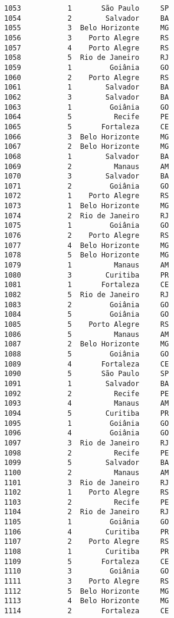 \documentclass[11pt]{article}
\begin{document}
\begin{Verbatim}[commandchars=\\\{\}]
1053           1       São Paulo     SP  
1054           2        Salvador     BA  
1055           3  Belo Horizonte     MG  
1056           3    Porto Alegre     RS  
1057           4    Porto Alegre     RS  
1058           5  Rio de Janeiro     RJ  
1059           1         Goiânia     GO  
1060           2    Porto Alegre     RS  
1061           1        Salvador     BA  
1062           3        Salvador     BA  
1063           1         Goiânia     GO  
1064           5          Recife     PE  
1065           5       Fortaleza     CE  
1066           3  Belo Horizonte     MG  
1067           2  Belo Horizonte     MG  
1068           1        Salvador     BA  
1069           2          Manaus     AM  
1070           3        Salvador     BA  
1071           2         Goiânia     GO  
1072           1    Porto Alegre     RS  
1073           1  Belo Horizonte     MG  
1074           2  Rio de Janeiro     RJ  
1075           1         Goiânia     GO  
1076           2    Porto Alegre     RS  
1077           4  Belo Horizonte     MG  
1078           5  Belo Horizonte     MG  
1079           1          Manaus     AM  
1080           3        Curitiba     PR  
1081           1       Fortaleza     CE  
1082           5  Rio de Janeiro     RJ  
1083           2         Goiânia     GO  
1084           5         Goiânia     GO  
1085           5    Porto Alegre     RS  
1086           5          Manaus     AM  
1087           2  Belo Horizonte     MG  
1088           5         Goiânia     GO  
1089           4       Fortaleza     CE  
1090           5       São Paulo     SP  
1091           1        Salvador     BA  
1092           2          Recife     PE  
1093           4          Manaus     AM  
1094           5        Curitiba     PR  
1095           1         Goiânia     GO  
1096           4         Goiânia     GO  
1097           3  Rio de Janeiro     RJ  
1098           2          Recife     PE  
1099           5        Salvador     BA  
1100           2          Manaus     AM  
1101           3  Rio de Janeiro     RJ  
1102           1    Porto Alegre     RS  
1103           2          Recife     PE  
1104           2  Rio de Janeiro     RJ  
1105           1         Goiânia     GO  
1106           4        Curitiba     PR  
1107           2    Porto Alegre     RS  
1108           1        Curitiba     PR  
1109           5       Fortaleza     CE  
1110           3         Goiânia     GO  
1111           3    Porto Alegre     RS  
1112           5  Belo Horizonte     MG  
1113           4  Belo Horizonte     MG  
1114           2       Fortaleza     CE  

\end{Verbatim}
\end{document}
